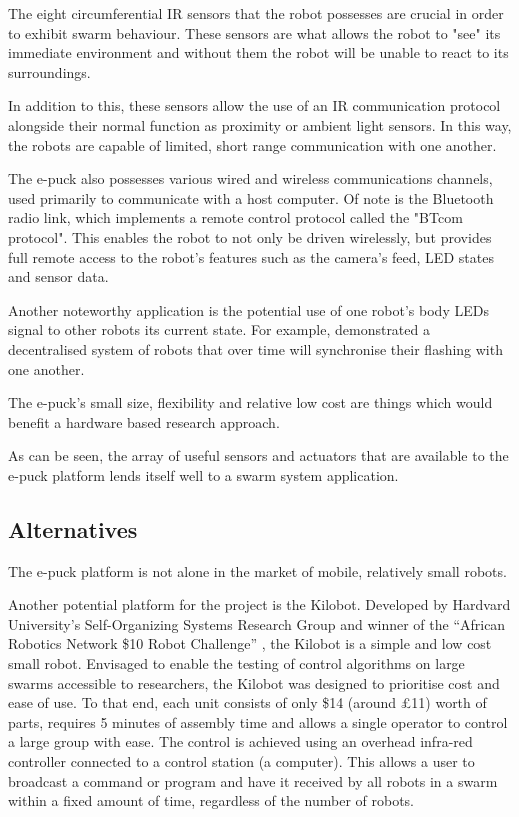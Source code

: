 \clearpage

The eight circumferential IR sensors that the robot possesses are crucial in order to exhibit swarm behaviour. These sensors are what allows the robot to "see" its immediate environment and without them the robot will be unable to react to its surroundings.

In addition to this, these sensors allow the use of an IR communication protocol alongside their normal function as proximity or ambient light sensors. In this way, the robots are capable of limited, short range communication with one another.

The e-puck also possesses various wired and wireless communications channels, used primarily to communicate with a host computer. Of note is the Bluetooth radio link, which implements a remote control protocol called the "BTcom protocol". This enables the robot to not only be driven wirelessly, but provides full remote access to the robot's features such as the camera's feed, LED states and sensor data. \cite{epfl-epuck}

Another noteworthy application is the potential use of one robot's body LEDs  signal to other robots its current state. For example, \citeauthor{Christensen:2009:FFS:1650386.1650393} demonstrated a decentralised system of robots that over time will synchronise their flashing with one another. \cite{Christensen:2009:FFS:1650386.1650393}

The e-puck's small size, flexibility and relative low cost are things which would benefit a hardware based research approach.

As can be seen, the array of useful sensors and actuators that are available to the e-puck platform lends itself well to a swarm system application. 

\subsection{Alternatives}
\label{alt}

The e-puck platform is not alone in the market of mobile, relatively small robots.

Another potential platform for the project is the Kilobot. Developed by Hardvard University's Self-Organizing Systems Research Group and winner of the ``African Robotics Network \$10 Robot Challenge'' \cite{afron}, the Kilobot is a simple and low cost small robot. Envisaged to enable the testing of control algorithms on large swarms accessible to researchers, the Kilobot was designed to prioritise cost and ease of use.  \cite{kilobot} To that end, each unit consists of only \$14 (around \pounds11) worth of parts, requires 5 minutes of assembly time and allows a single operator to control a large group with ease. The control is achieved using an overhead infra-red controller connected to a control station (a computer). This allows a user to broadcast a command or program and have it received by all robots in a swarm within a fixed amount of time, regardless of the number of robots.

